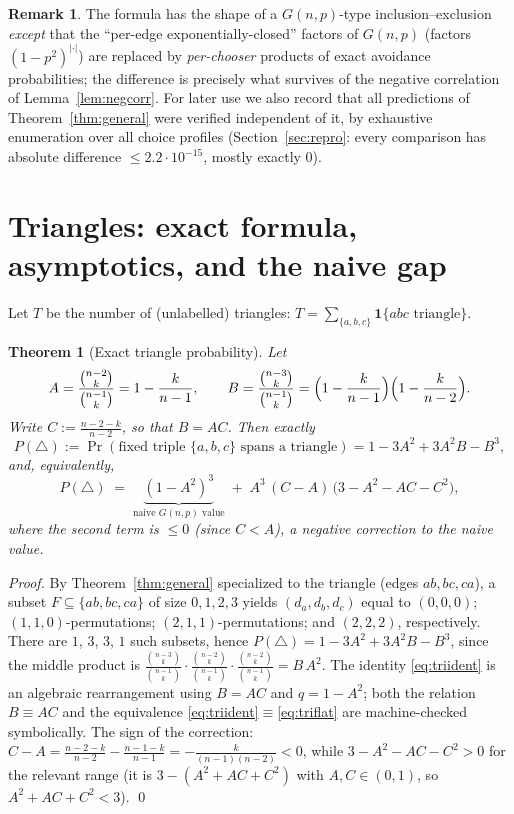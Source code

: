 \documentclass[11pt,a4paper]{article}
\newtheorem{theorem}{Theorem}[section]
\theoremstyle{definition}
\newtheorem*{remark}{Remark}
\theoremstyle{definition}
\begin{document}
\begin{remark}
The formula has the shape of a $G(n,p)$-type inclusion--exclusion \emph{except}
that the ``per-edge exponentially-closed'' factors of $G(n,p)$
(factors $(1-p^2)^{|\cdot|}$) are replaced by \emph{per-chooser} products of exact
avoidance probabilities; the difference is precisely what survives of the negative
correlation of Lemma~\ref{lem:negcorr}. For later use we also record that all
predictions of Theorem~\ref{thm:general} were verified independent of it, by
exhaustive enumeration over all choice profiles
(Section~\ref{sec:repro}: every comparison has absolute difference $\le 2.2\cdot
10^{-15}$, mostly exactly $0$).
\end{remark}

\section{Triangles: exact formula, asymptotics, and the naive gap}\label{sec:tri}

Let $T$ be the number of (unlabelled) triangles: $T=\sum_{\{a,b,c\}}\mathbf 1\{abc
\text{ triangle}\}$.

\begin{theorem}[Exact triangle probability]\label{thm:tri}
Let
\[
A=\frac{\binom{n-2}{k}}{\binom{n-1}{k}} = 1-\frac{k}{n-1},\qquad
B=\frac{\binom{n-3}{k}}{\binom{n-1}{k}}
=\Bigl(1-\frac{k}{n-1}\Bigr)\Bigl(1-\frac{k}{n-2}\Bigr).
\]
Write $C:=\tfrac{n-2-k}{n-2}$, so that $B=AC$. Then exactly
\begin{equation}\label{eq:triflat}
P(\triangle):=\Pr(\text{fixed triple }\{a,b,c\}\text{ spans a triangle})
=1-3A^{2}+3A^{2}B-B^{3},
\end{equation}
and, equivalently,
\begin{equation}\label{eq:triident}
P(\triangle)\;=\;\underbrace{(1-A^{2})^{3}}_{\text{naive }G(n,p)\text{ value}}\;+\;
A^{3}\,(C-A)\,\bigl(3-A^{2}-AC-C^{2}\bigr),
\end{equation}
where the second term is $\le 0$ (since $C<A$), a \emph{negative correction} to the
naive value.
\end{theorem}

\begin{proof}
By Theorem~\ref{thm:general} specialized to the triangle (edges $ab,bc,ca$), a subset
$F\subseteq\{ab,bc,ca\}$ of size $0,1,2,3$ yields $(d_a,d_b,d_c)$ equal to
$(0,0,0)$; $(1,1,0)$-permutations; $(2,1,1)$-permutations; and $(2,2,2)$,
respectively. There are $1$, $3$, $3$, $1$ such subsets, hence
$P(\triangle)=1-3A^2+3A^2B-B^3$, since the middle product is
$\frac{\binom{n-3}{k}}{\binom{n-1}{k}}\cdot
\frac{\binom{n-2}{k}}{\binom{n-1}{k}}\cdot\frac{\binom{n-2}{k}}{\binom{n-1}{k}} = B\,A^2$.
The identity \eqref{eq:triident} is an algebraic rearrangement using $B=AC$
and $q=1-A^2$; both the relation $B\equiv AC$ and the equivalence
\eqref{eq:triident}$\equiv$\eqref{eq:triflat} are machine-checked symbolically.
The sign of the correction: $C - A = \tfrac{n-2-k}{n-2} - \tfrac{n-1-k}{n-1}
= -\tfrac{k}{(n-1)(n-2)}< 0$, while $3-A^2-AC-C^2 >0$ for the relevant range
(it is $3 - (A^2+AC+C^2)$ with $A,C \in (0,1)$, so $A^2+AC+C^2 < 3$).
\qed
\end{proof}
\end{document}
